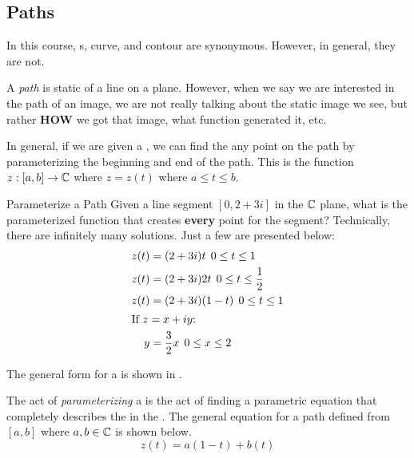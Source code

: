 \subsection{Paths}\label{subsec:Paths}
In this course, s, curve, and contour are synonymous.
However, in general, they are not.

\begin{definition}[Path]\label{def:Path}
  A \emph{path} is static  of a line on a plane.
  However, when we say we are interested in the path of an image, we are not really talking about the static image we see, but rather \textbf{HOW} we got that image, what function generated it, etc.
\end{definition}

In general, if we are given a , we can find the any point on the path by parameterizing the beginning and end of the path.
This is the function $z: [a, b] \to \operatorname{\mathbb{C}}$ where $z = z(t)$ where $a \leq t \leq b$.

\begin{example}{Parameterize a Path}
  Given a line segment $[0, 2+3i]$ in the $\operatorname{\mathbb{C}}$ plane, what is the parameterized function that creates \textbf{every} point for the segment?
  \tcblower{}
  Technically, there are infinitely many solutions.
  Just a few are presented below:
  \begin{align*}
    z(t) &= (2 + 3i)t \:\: 0 \leq t \leq 1 \\
    z(t) &= (2 + 3i)2t \:\: 0 \leq t \leq \frac{1}{2} \\
    z(t) &= (2 + 3i)(1-t) \:\: 0 \leq t \leq 1 \\
    \shortintertext{If $z = x + iy$:}
    y &= \frac{3}{2} x \:\: 0 \leq x \leq 2
  \end{align*}
\end{example}

The general form for  a  is shown in .

\begin{definition}[Parameterizing]\label{def:Parameterizing_Path}
  The act of \emph{parameterizing} a  is the act of finding a parametric equation that completely describes the  in the .
  The general equation for a path defined from $[a, b]$ where $a, b \in \operatorname{\mathbb{C}}$ is shown below.
  \begin{equation}\label{eq:Parameterizing_Path}
    z(t) = a(1-t) + b(t)
  \end{equation}
\end{definition}

